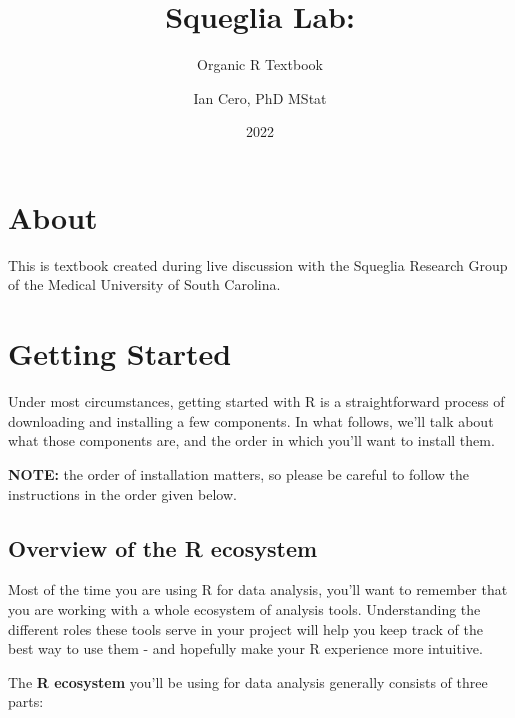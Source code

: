 \documentclass[
]{book}
\title{Squeglia Lab:}
\subtitle{Organic R Textbook}
\author{Ian Cero, PhD MStat}
\date{2022}
\begin{document}
\maketitle

{
\setcounter{tocdepth}{1}
\tableofcontents
}
\newpage

\hypertarget{about}{%
\chapter{About}\label{about}}

This is textbook created during live discussion with the Squeglia Research Group of the Medical University of South Carolina.

\hypertarget{getting-started}{%
\chapter{Getting Started}\label{getting-started}}

Under most circumstances, getting started with R is a straightforward process of downloading and installing a few components. In what follows, we'll talk about what those components are, and the order in which you'll want to install them.

\textbf{NOTE:} the order of installation matters, so please be careful to follow the instructions in the order given below.

\hypertarget{overview-of-the-r-ecosystem}{%
\section{Overview of the R ecosystem}\label{overview-of-the-r-ecosystem}}

Most of the time you are using R for data analysis, you'll want to remember that you are working with a whole ecosystem of analysis tools. Understanding the different roles these tools serve in your project will help you keep track of the best way to use them - and hopefully make your R experience more intuitive.

The \textbf{R ecosystem} you'll be using for data analysis generally consists of three parts:
\end{document}
